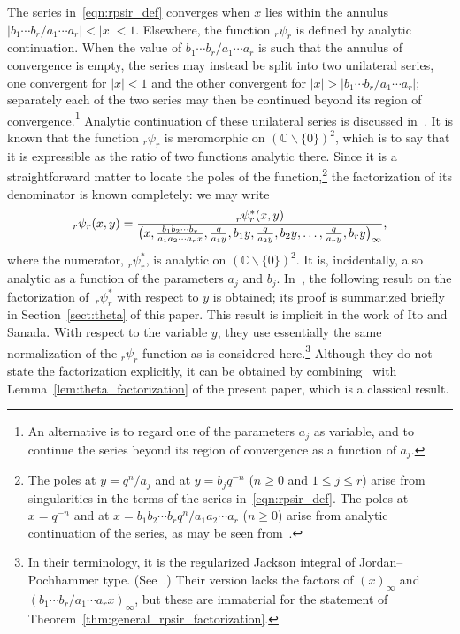 \documentclass[pdftex]{sigma}
\numberwithin{equation}{section}
\newcommand{\C}{\mathbb{C}}
\begin{document}
The series in~\eqref{eqn:rpsir_def} converges when $x$ lies within the annulus $|b_1\cdots b_r/a_1\cdots a_r|<|x|<1$. Elsewhere, the function $_r\psi_r$ is defined by analytic continuation. When the value of $b_1\cdots b_r/a_1\cdots a_r$ is such that the annulus of convergence is empty, the series may instead be split into two unilateral series, one convergent for $|x|<1$ and the other convergent for $|x|>|b_1\cdots b_r/a_1\cdots a_r|$; separately each of the two series may then be continued beyond its region of convergence.\footnote{An alternative is to regard one of the parameters $a_j$ as variable, and to continue the series beyond its region of convergence as a function of $a_j$.} Analytic continuation of these unilateral series is discussed in~\cite[Section~4.5]{Gasper2004}. It is known that the function $_r\psi_r$ is meromorphic on $(\C \backslash \{0\})^2$, which is to say that it is expressible as the ratio of two functions analytic there. Since it is a straightforward matter to locate the poles of the function,\footnote{The poles at $y=q^n/a_j$ and at $y=b_j q^{-n}$ ($n \geq 0$ and $1 \leq j \leq r$) arise from singularities in the terms of the series in~\eqref{eqn:rpsir_def}. The poles at $x=q^{-n}$ and at $x = b_1 b_2 \cdots b_r q^n /a_1 a_2 \cdots a_r$ ($n \geq 0$) arise from analytic continuation of the series, as may be seen from~\cite[equation~(4.5.2)]{Gasper2004}.} the factorization of its denominator is known completely: we may write
\[ _r\psi_r(x,y) = {_r^{}\psi_r^\ast(x,y) \over \bigl(x,{b_1 b_2 \cdots b_r \over a_1 a_2 \cdots a_r x},{q \over a_1y},b_1y,{q \over a_2y},b_2y,\dots,{q \over a_ry},b_ry\bigr)_{ \infty}}, \]
where the numerator, $_r^{}\psi_r^\ast$, is analytic on $(\C \backslash \{0\})^2$. It is, incidentally, also analytic as a function of the parameters $a_j$ and $b_j$. In~\cite[Section~3.4]{Bradley-Thrush2023}, the following result on the factorization of~$_r^{}\psi_r^\ast$ with respect to $y$ is obtained; its proof is summarized briefly in Section~\ref{sect:theta} of this paper. This result is implicit in the work of Ito and Sanada. With respect to the variable $y$, they use essentially the same normalization of the $_r\psi_r$ function as is considered here.\footnote{In their terminology, it is the regularized Jackson integral of Jordan--Pochhammer type. (See~\cite[Sections~2.3 and~5.1]{Ito2008}.) Their version lacks the factors of $(x)_\infty$ and $(b_1 \cdots b_r/a_1 \cdots a_r x)_\infty$, but these are immaterial for the statement of Theorem~\ref{thm:general_rpsir_factorization}.} Although they do not state the factorization explicitly, it can be obtained by combining~\cite[Lemma~5.5]{Ito2008} with Lemma~\ref{lem:theta_factorization} of the present paper, which is a classical result.
\end{document}
